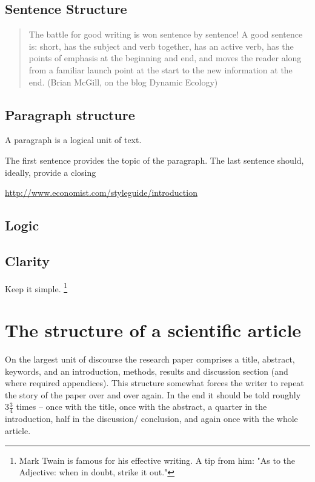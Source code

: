 \documentclass{tufte-book}
\begin{document}
\subsection{Sentence Structure}

\begin{quote}
The battle for good writing is won sentence by sentence! A good sentence is: short, has the subject and verb together, has an active verb, has the points of emphasis at the beginning and end, and moves the reader along from a familiar launch point at the start to the new information at the end. (Brian McGill, on the blog Dynamic Ecology)
\end{quote}



\subsection{Paragraph structure}

A paragraph is a logical unit of text. 

The first sentence provides the topic of the paragraph. The last sentence should, ideally, provide a closing 



\href{http://www.economist.com/styleguide/introduction}{http://www.economist.com/styleguide/introduction}




\subsection{Logic}


\subsection{Clarity}

Keep it simple. \footnote{Mark Twain is famous for his effective writing. A tip from him: "As to the Adjective: when in doubt, strike it out."}



\section{The structure of a scientific article}   
On the largest unit of discourse the research paper comprises a title, abstract, keywords, and an introduction, methods, results and discussion section (and where required appendices). 
This structure somewhat forces the writer to repeat the story of the paper over and over again. In the end  it should be told roughly $3\frac{3}{4}$ times -- once with the title, once with the abstract, a quarter in the introduction, half in the discussion/ conclusion, and again once with the whole article.
\end{document}
